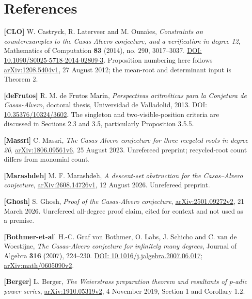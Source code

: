 \documentclass[
  british,
  10pt,
  a4paper,
]{article}
\begin{document}
\section{References}\label{references}

\textbf{{[}CLO{]}} W. Castryck, R. Laterveer and M. Ounaïes,
\emph{Constraints on counterexamples to the Casas-Alvero conjecture, and
a verification in degree 12}, Mathematics of Computation \textbf{83}
(2014), no. 290, 3017--3037.
\href{https://doi.org/10.1090/S0025-5718-2014-02809-3}{DOI:
10.1090/S0025-5718-2014-02809-3}. Proposition numbering here follows
\href{https://arxiv.org/abs/1208.5404v1}{arXiv:1208.5404v1}, 27 August
2012; the mean-root and determinant input is Theorem 2.

\textbf{{[}deFrutos{]}} R. M. de Frutos Marín, \emph{Perspectivas
aritméticas para la Conjetura de Casas-Alvero}, doctoral thesis,
Universidad de Valladolid, 2013.
\href{https://doi.org/10.35376/10324/3602}{DOI: 10.35376/10324/3602}.
The singleton and two-visible-position criteria are discussed in
Sections 2.3 and 3.5, particularly Proposition 3.5.5.

\textbf{{[}Massri{]}} C. Massri, \emph{The Casas-Alvero conjecture for
three recycled roots in degree 20},
\href{https://arxiv.org/abs/1806.09561v6}{arXiv:1806.09561v6}, 25 August
2023. Unrefereed preprint; recycled-root count differs from monomial
count.

\textbf{{[}Marashdeh{]}} M. F. Marashdeh, \emph{A descent-set
obstruction for the Casas--Alvero conjecture},
\href{https://arxiv.org/abs/2608.14726v1}{arXiv:2608.14726v1}, 12 August
2026. Unrefereed preprint.

\textbf{{[}Ghosh{]}} S. Ghosh, \emph{Proof of the Casas-Alvero
conjecture},
\href{https://arxiv.org/abs/2501.09272v2}{arXiv:2501.09272v2}, 21 March
2026. Unrefereed all-degree proof claim, cited for context and not used
as a premise.

\textbf{{[}Bothmer-et-al{]}} H.-C. Graf von Bothmer, O. Labs, J. Schicho
and C. van de Woestijne, \emph{The Casas-Alvero conjecture for
infinitely many degrees}, Journal of Algebra \textbf{316} (2007),
224--230. \href{https://doi.org/10.1016/j.jalgebra.2007.06.017}{DOI:
10.1016/j.jalgebra.2007.06.017};
\href{https://arxiv.org/abs/math/0605090v2}{arXiv:math/0605090v2}.

\textbf{{[}Berger{]}} L. Berger, \emph{The Weierstrass preparation
theorem and resultants of p-adic power series},
\href{https://arxiv.org/abs/1910.05319v2}{arXiv:1910.05319v2}, 4
November 2019, Section 1 and Corollary 1.2.
\end{document}
